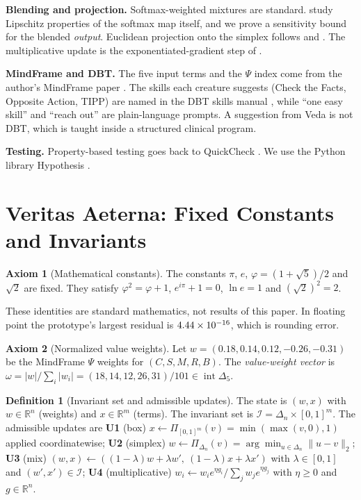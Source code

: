 \documentclass[11pt]{article}
\theoremstyle{definition}
\newtheorem{definition}{Definition}
\newtheorem{axiom}{Axiom}
\theoremstyle{remark}
\newcommand{\R}{\mathbb{R}}
\newcommand{\Simp}{\Delta}
\newcommand{\norm}[1]{\lVert #1\rVert}
\begin{document}
\textbf{Blending and projection.} Softmax-weighted mixtures are standard. \citet{gao2017} study Lipschitz properties of the softmax map itself, and we prove a sensitivity bound for the blended \emph{output}. Euclidean projection onto the simplex follows \citet{held1974} and \citet{duchi2008}. The multiplicative update is the exponentiated-gradient step of \citet{kivinen1997}.

\textbf{MindFrame and DBT.} The five input terms and the $\Psi$ index come from the author's MindFrame paper \citep{espinosa2026mindframe}. The skills each creature suggests (Check the Facts, Opposite Action, TIPP) are named in the DBT skills manual \citep{linehan2015}, while ``one easy skill'' and ``reach out'' are plain-language prompts. A suggestion from Veda is not DBT, which is taught inside a structured clinical program.

\textbf{Testing.} Property-based testing goes back to QuickCheck \citep{claessen2000}. We use the Python library Hypothesis \citep{maciver2019}.

\section{Veritas Aeterna: Fixed Constants and Invariants}\label{sec:veritas}
\begin{axiom}[Mathematical constants]\label{ax:const}
The constants $\pi$, $e$, $\varphi=(1+\sqrt5)/2$ and $\sqrt2$ are fixed. They satisfy $\varphi^2=\varphi+1$, $e^{i\pi}+1=0$, $\ln e=1$ and $(\sqrt2)^2=2$.
\end{axiom}
These identities are standard mathematics, not results of this paper. In floating point the prototype's largest residual is $4.44\times10^{-16}$, which is rounding error.

\begin{axiom}[Normalized value weights]\label{ax:omega}
Let $w=(0.18,0.14,0.12,-0.26,-0.31)$ be the MindFrame $\Psi$ weights for $(C,S,M,R,B)$. The \emph{value-weight vector} is $\omega=|w|/\sum_i|w_i|=(18,14,12,26,31)/101\in\operatorname{int}\Simp_5$.
\end{axiom}

\begin{definition}[Invariant set and admissible updates]
The state is $(w,x)$ with $w\in\R^n$ (weights) and $x\in\R^m$ (terms). The invariant set is $\mathcal I=\Simp_n\times[0,1]^m$. The admissible updates are
\textbf{U1} (box) $x\leftarrow \Pi_{[0,1]^m}(v)=\min(\max(v,0),1)$ applied coordinatewise;
\textbf{U2} (simplex) $w\leftarrow\Pi_{\Simp_n}(v)=\arg\min_{u\in\Simp_n}\norm{u-v}_2$;
\textbf{U3} (mix) $(w,x)\leftarrow((1-\lambda)w+\lambda w',\ (1-\lambda)x+\lambda x')$ with $\lambda\in[0,1]$ and $(w',x')\in\mathcal I$;
\textbf{U4} (multiplicative) $w_i\leftarrow w_i e^{\eta g_i}/\sum_j w_je^{\eta g_j}$ with $\eta\ge0$ and $g\in\R^n$.
\end{definition}
\end{document}
